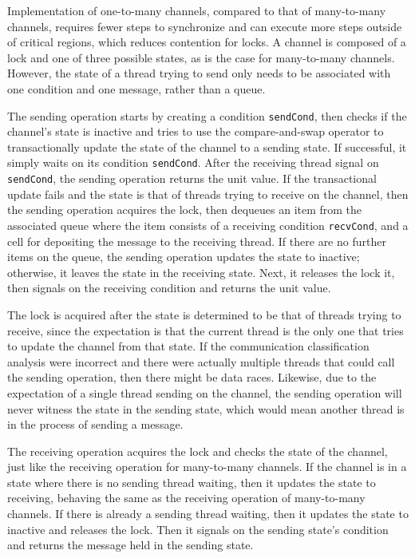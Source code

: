 \documentclass[letterpaper, 11pt]{extarticle}
\begin{document}
Implementation of one-to-many channels, compared to that of many-to-many channels,
requires fewer
steps to synchronize and can execute more steps outside of critical regions, which reduces
contention for locks. A channel is composed of a lock and one of three possible states, as is
the case for many-to-many channels.  However, the state of a thread trying to send only needs
to be associated with one condition and one message, rather than a queue.  

The sending operation starts by creating a condition \lstinline{sendCond}, then checks
if the channel's state is inactive and tries to use the
compare-and-swap operator to transactionally update the state of
the channel to a sending state.
If successful, it simply waits on its condition \lstinline{sendCond}.
After the receiving thread signal on \lstinline{sendCond}, the sending operation returns the unit value.
If the transactional update fails and the state is
that of threads trying to receive on the channel, then the sending operation acquires the lock,
then dequeues an item from the associated queue where the item consists of a receiving condition \lstinline{recvCond},
and a cell for depositing the message to the receiving thread.
If there are no further items on the queue, the sending operation updates the state to inactive; otherwise, it
leaves the state in the receiving state.
Next, it releases the lock it, then signals on the receiving condition and returns the unit value.

The lock is acquired after the state is determined to be that of
threads trying to receive, since the expectation is that the current thread is the only one
that tries to update the channel from that state.  If the communication classification analysis were
incorrect and there were actually multiple threads that could call the sending operation,
then there might be data races.  Likewise, due to the expectation of a single thread
sending on the channel, the sending operation will never witness the state in the sending state,
which would mean another thread is in the process of sending a message.

The receiving operation acquires the lock and checks
the state of the channel, just like the receiving operation for many-to-many channels.
If the channel is in a state where there is no sending thread waiting,
then it updates the state to receiving, behaving the same as the receiving operation of many-to-many channels.
If there is already a sending thread waiting, then it updates the state to inactive and
releases the lock. Then it signals on the sending state's condition and
returns the message held in the sending state.
\end{document}
